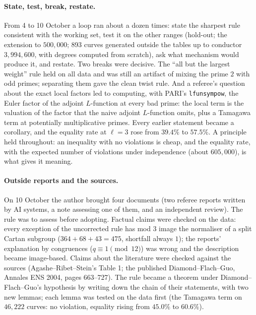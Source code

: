 \documentclass[11pt,a4paper]{article}
\begin{document}
\paragraph{State, test, break, restate.} From 4 to 10 October a loop ran about a dozen times: state the sharpest rule consistent with the working set, test it on the other ranges (hold-out; the extension to $500{,}000$; 893 curves generated outside the tables up to conductor $3{,}994{,}600$, with degrees computed from scratch), ask what mechanism would produce it, and restate. Two breaks were decisive. The ``all but the largest weight'' rule held on all data and was still an artifact of mixing the prime $2$ with odd primes; separating them gave the clean twist rule. And a referee's question about the exact local factors led to computing, with PARI's \texttt{lfunsympow}, the Euler factor of the adjoint $L$-function at every bad prime: the local term is the valuation of the factor that the naive adjoint $L$-function omits, plus a Tamagawa term at potentially multiplicative primes. Every earlier statement became a corollary, and the equality rate at $\ell=3$ rose from $39.4\%$ to $57.5\%$. A principle held throughout: an inequality with no violations is cheap, and the equality rate, with the expected number of violations under independence (about $605{,}000$), is what gives it meaning.

\paragraph{Outside reports and the sources.} On 10 October the author brought four documents (two referee reports written by AI systems, a note assessing one of them, and an independent review). The rule was to assess before adopting. Factual claims were checked on the data: every exception of the uncorrected rule has mod $3$ image the normaliser of a split Cartan subgroup ($364+68+43=475$, shortfall always $1$); the reports' explanation by congruences ($q\equiv1\pmod{12}$) was wrong and the description became image-based. Claims about the literature were checked against the sources (Agashe--Ribet--Stein's Table 1; the published Diamond--Flach--Guo, Annales ENS 2004, pages 663--727). The rule became a theorem under Diamond--Flach--Guo's hypothesis by writing down the chain of their statements, with two new lemmas; each lemma was tested on the data first (the Tamagawa term on $46{,}222$ curves: no violation, equality rising from $45.0\%$ to $60.6\%$).
\end{document}
